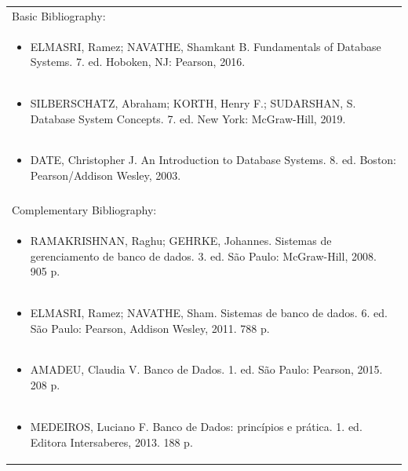 \documentclass[11pt]{article}
\begin{document}
\begin{center}
\begin{longtable}{|p{4cm}|p{4cm}|p{4cm}|p{4cm}|}
\hline
\multicolumn{4}{|p{16cm}|}{Basic Bibliography:}\\*
\multicolumn{4}{|p{\dimexpr 16cm + 6\tabcolsep\relax}|}{\begin{itemize}\item ELMASRI, Ramez; NAVATHE, Shamkant B. Fundamentals of Database Systems. 7. ed. Hoboken, NJ: Pearson, 2016.\end{itemize}}\\
\multicolumn{4}{|p{\dimexpr 16cm + 6\tabcolsep\relax}|}{\begin{itemize}\item SILBERSCHATZ, Abraham; KORTH, Henry F.; SUDARSHAN, S. Database System Concepts. 7. ed. New York: McGraw-Hill, 2019.\end{itemize}}\\
\multicolumn{4}{|p{\dimexpr 16cm + 6\tabcolsep\relax}|}{\begin{itemize}\item DATE, Christopher J. An Introduction to Database Systems. 8. ed. Boston: Pearson/Addison Wesley, 2003.\end{itemize}}\\
\multicolumn{4}{|p{16cm}|}{}\\
\hline
\multicolumn{4}{|p{16cm}|}{Complementary Bibliography:}\\*
\multicolumn{4}{|p{\dimexpr 16cm + 6\tabcolsep\relax}|}{\begin{itemize}\item RAMAKRISHNAN, Raghu; GEHRKE, Johannes. Sistemas de gerenciamento de banco de dados. 3. ed. São Paulo: McGraw-Hill, 2008. 905 p.\end{itemize}}\\
\multicolumn{4}{|p{\dimexpr 16cm + 6\tabcolsep\relax}|}{\begin{itemize}\item ELMASRI, Ramez; NAVATHE, Sham. Sistemas de banco de dados. 6. ed. São Paulo: Pearson, Addison Wesley, 2011. 788 p.\end{itemize}}\\
\multicolumn{4}{|p{\dimexpr 16cm + 6\tabcolsep\relax}|}{\begin{itemize}\item AMADEU, Claudia V. Banco de Dados. 1. ed. São Paulo: Pearson, 2015. 208 p.\end{itemize}}\\
\multicolumn{4}{|p{\dimexpr 16cm + 6\tabcolsep\relax}|}{\begin{itemize}\item MEDEIROS, Luciano F. Banco de Dados: princípios e prática. 1. ed. Editora Intersaberes, 2013. 188 p.\end{itemize}}\\

\end{longtable}
\end{center}
\end{document}
